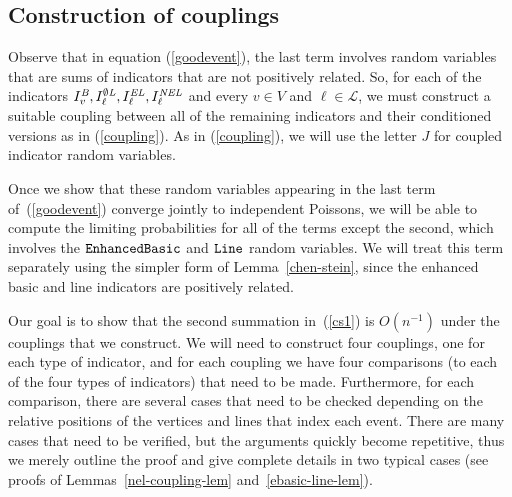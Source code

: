 \documentclass{amsart}
\newcommand{\vect}[1]{{ #1}}
\newcommand{\B}{I^{\text{\em B}}}
\newcommand{\OL}{I^{\emptyset\text{\em L}}}
\newcommand{\EL}{I^{\text{\em EL}}}
\newcommand{\NEL}{I^{\text{\em NEL}}}
\newcommand{\lin}{\operatorname{\tt Line}}
\newcommand{\ebasic}{\operatorname{\tt Enhanced Basic}}
\numberwithin{equation}{section}
\newcommand{\lineset}{\mathscr{L}}
\newcommand{\Ln}{\ell}
\theoremstyle{definition}
\theoremstyle{remark}
\begin{document}
\subsection*{Construction of couplings}
Observe that in equation (\ref{goodevent}), the last term involves random variables that are sums of indicators that are not positively related.  So, for each of the indicators $\B_{\vect{v}}, \OL_\Ln, \EL_{\Ln}, \NEL_{\Ln}$ and every $\vect{v}\in V$ and $\Ln \in \lineset$, we must construct a suitable coupling between all of the remaining indicators and their conditioned versions as in (\ref{coupling}).  As in (\ref{coupling}), we will use the letter $J$ for coupled indicator random variables.

Once we show that these random variables appearing in the last term of~(\ref{goodevent}) converge jointly to independent Poissons, we will be able to compute the limiting probabilities for all of the terms except the second, which involves the $\ebasic$ and $\lin$ random variables.  We will treat this term separately using the simpler form of Lemma~\ref{chen-stein}, since the enhanced basic and line indicators are positively related.

Our goal is to show that the second summation in~(\ref{cs1}) is $O(n^{-1})$ under the couplings that we construct.  We will need to construct four couplings, one for each type of indicator, and for each coupling we have four comparisons (to each of the four types of indicators) that need to be made.  Furthermore, for each comparison, there are several cases that need to be checked depending on the relative positions of the vertices and lines that index each event.  There are many cases that need to be verified, but the arguments quickly become repetitive, thus we merely outline the proof and give complete details in two typical cases (see proofs of Lemmas~\ref{nel-coupling-lem} and~\ref{ebasic-line-lem}).
\end{document}
